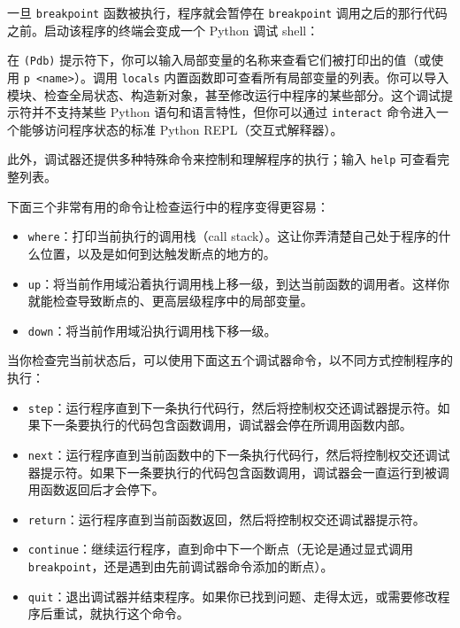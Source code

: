 一旦 \texttt{breakpoint} 函数被执行，程序就会暂停在 \texttt{breakpoint} 调用之后的那行代码之前。启动该程序的终端会变成一个 Python 调试 shell：


在 \texttt{(Pdb)} 提示符下，你可以输入局部变量的名称来查看它们被打印出的值（或使用 \texttt{p <name>}）。调用 \texttt{locals} 内置函数即可查看所有局部变量的列表。你可以导入模块、检查全局状态、构造新对象，甚至修改运行中程序的某些部分。这个调试提示符并不支持某些 Python 语句和语言特性，但你可以通过 \texttt{interact} 命令进入一个能够访问程序状态的标准 Python REPL（交互式解释器）。

此外，调试器还提供多种特殊命令来控制和理解程序的执行；输入 \texttt{help} 可查看完整列表。

下面三个非常有用的命令让检查运行中的程序变得更容易：

\begin{itemize}
\item \texttt{where}：打印当前执行的调用栈（call stack）。这让你弄清楚自己处于程序的什么位置，以及是如何到达触发断点的地方的。
\item \texttt{up}：将当前作用域沿着执行调用栈上移一级，到达当前函数的调用者。这样你就能检查导致断点的、更高层级程序中的局部变量。
\item \texttt{down}：将当前作用域沿执行调用栈下移一级。
\end{itemize}

当你检查完当前状态后，可以使用下面这五个调试器命令，以不同方式控制程序的执行：

\begin{itemize}
\item \texttt{step}：运行程序直到下一条执行代码行，然后将控制权交还调试器提示符。如果下一条要执行的代码包含函数调用，调试器会停在所调用函数内部。
\item \texttt{next}：运行程序直到当前函数中的下一条执行代码行，然后将控制权交还调试器提示符。如果下一条要执行的代码包含函数调用，调试器会一直运行到被调用函数返回后才会停下。
\item \texttt{return}：运行程序直到当前函数返回，然后将控制权交还调试器提示符。
\item \texttt{continue}：继续运行程序，直到命中下一个断点（无论是通过显式调用 \texttt{breakpoint}，还是遇到由先前调试器命令添加的断点）。
\item \texttt{quit}：退出调试器并结束程序。如果你已找到问题、走得太远，或需要修改程序后重试，就执行这个命令。
\end{itemize}

